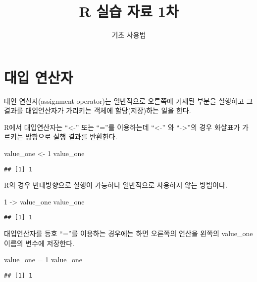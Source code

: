 \documentclass[
]{article}
\title{R 실습 자료 1차}
\subtitle{기초 사용법}
\author{}
\date{\vspace{-2.5em}}
\newenvironment{Shaded}{\begin{snugshade}}{\end{snugshade}}
\newcommand{\DecValTok}[1]{\textcolor[rgb]{0.00,0.00,0.81}{#1}}
\newcommand{\NormalTok}[1]{#1}
\newcommand{\OtherTok}[1]{\textcolor[rgb]{0.56,0.35,0.01}{#1}}
\begin{document}
\maketitle

\hypertarget{uxb300uxc785-uxc5f0uxc0b0uxc790}{%
\section{대입 연산자}\label{uxb300uxc785-uxc5f0uxc0b0uxc790}}

대인 연산자(assignment operator)는 일반적으로 오른쪽에 기재된 부분을
실행하고 그 결과를 대입연산자가 가리키는 객체에 할당(저장)하는 일을
한다.

R에서 대입연산자는 ``\textless-'' 또는 ``=''를 이용하는데 ``\textless-''
와 ``-\textgreater{}''의 경우 화살표가 가르키는 방향으로 실행 결과를
반환한다.

\begin{Shaded}
\begin{Highlighting}[]
\NormalTok{value\_one }\OtherTok{\textless{}{-}} \DecValTok{1}
\NormalTok{value\_one}
\end{Highlighting}
\end{Shaded}

\begin{verbatim}
## [1] 1
\end{verbatim}

R의 경우 반대방향으로 실행이 가능하나 일반적으로 사용하지 않는 방법이다.

\begin{Shaded}
\begin{Highlighting}[]
\DecValTok{1} \OtherTok{{-}\textgreater{}}\NormalTok{ value\_one}
\NormalTok{value\_one}
\end{Highlighting}
\end{Shaded}

\begin{verbatim}
## [1] 1
\end{verbatim}

대입연산자를 등호 ``=''를 이용하는 경우에는 하면 오른쪽의 연산을 왼쪽의
value\_one 이름의 변수에 저장한다.

\begin{Shaded}
\begin{Highlighting}[]
\NormalTok{value\_one }\OtherTok{=} \DecValTok{1}
\NormalTok{value\_one}
\end{Highlighting}
\end{Shaded}

\begin{verbatim}
## [1] 1
\end{verbatim}
\end{document}
